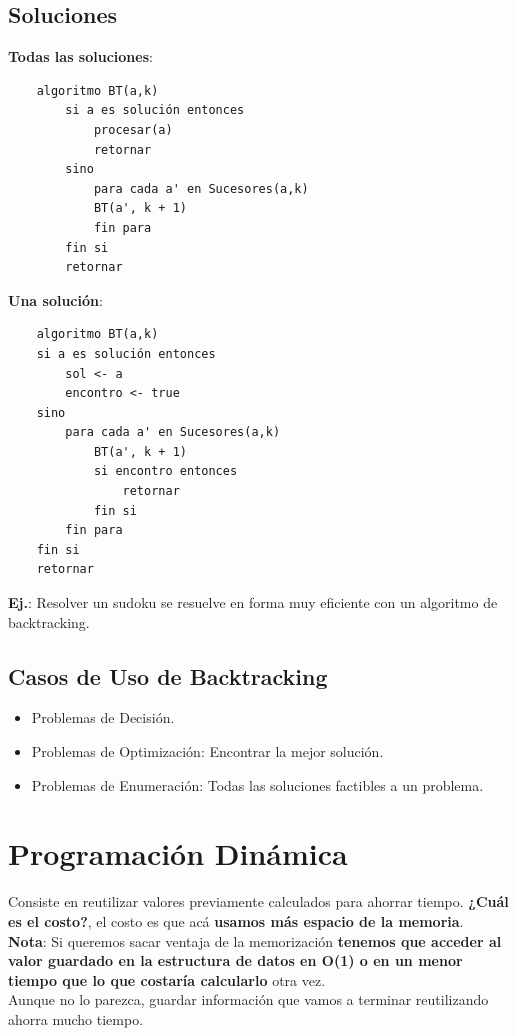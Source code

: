 \documentclass[10pt,a4paper]{article}
\begin{document}
\subsection*{Soluciones}
\textbf{Todas las soluciones}:
\begin{lstlisting}
    algoritmo BT(a,k)
        si a es solución entonces
            procesar(a)
            retornar
        sino
            para cada a' en Sucesores(a,k)
            BT(a', k + 1)
            fin para
        fin si
        retornar
\end{lstlisting}
\textbf{Una solución}:
\begin{lstlisting}
    algoritmo BT(a,k)
    si a es solución entonces
        sol <- a
        encontro <- true
    sino
        para cada a' en Sucesores(a,k)
            BT(a', k + 1)
            si encontro entonces
                retornar
            fin si
        fin para
    fin si
    retornar
\end{lstlisting}
\textbf{Ej.}: Resolver un sudoku se resuelve en forma muy eficiente con un algoritmo de backtracking.
\subsection*{Casos de Uso de Backtracking}
\begin{itemize}
    \item Problemas de Decisión.
    \item Problemas de Optimización: Encontrar la mejor solución.
    \item Problemas de Enumeración: Todas las soluciones factibles a un problema.
\end{itemize}
\section*{Programación Dinámica}
Consiste en reutilizar valores previamente calculados para ahorrar tiempo. \textbf{¿Cuál es el costo?}, el costo es que acá \textbf{usamos más espacio de la memoria}. \\

\textbf{Nota}: Si queremos sacar ventaja de la memorización \textbf{tenemos que acceder al valor guardado en la estructura de datos en O(1) o en un menor tiempo que lo que costaría calcularlo} otra vez. \\

Aunque no lo parezca, guardar información que vamos a terminar reutilizando ahorra mucho tiempo. \\
\end{document}
